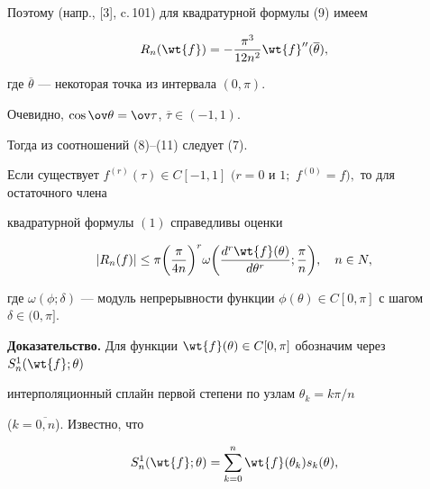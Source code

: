 Поэтому (напр., [3], c.\,101) для квадратурной формулы (9) имеем


\begin{equation}


R_n( \wt{f}) = - \frac{ \pi^3}{12n^2} \wt{f} ''(


\overline{\theta}),


\end{equation}


где $\overline{ \theta}$ --- некоторая точка из интервала $(0, \pi)$.


Очевидно, $\cos\ov\theta=\ov\tau$, $\overline{\tau} \in


(-1,1)$.


Тогда из соотношений (8)--(11) следует (7).





\begin{thm}


Если существует $ f^{(r)}( \tau) \in


C[-1,1]$ $(r=0$ и $1;$ $f^{(0)} =f),$ то для остаточного члена


квадратурной формулы $(1)$ справедливы оценки


\begin{equation}


| R_n(f) | \leq \pi \bigg( \frac{\pi}{4n} \bigg)^r \omega \bigg(


\frac{d^r \wt{f}( \theta)}{d \theta^r}; \frac{\pi}{n} \bigg), \quad n \in N,


\end{equation}


где $\omega(\phi; \delta)$ --- модуль непрерывности функции $\phi


( \theta) \in C[0, \pi]$ с шагом $\delta \in (0, \pi] $.


\end{thm}





{\bf Доказательство.} Для функции $\wt{f}(\theta) \in


C[0,\pi]$ обозначим через $S_n^1 (\wt{f};\theta)$ 


интерполяционный сплайн первой степени по узлам $\theta_k=k \pi/n$


($k=\overline{0,n}$). Известно, что


$$


S_n^1( \wt{f}; \theta) = \sum_{k=0}^n \wt{f}( \theta_k) s_k(\theta),


$$


